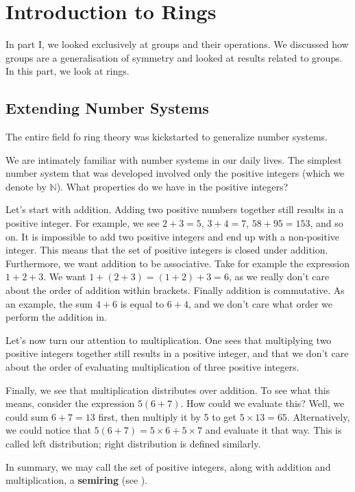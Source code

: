 \chapter{Introduction to Rings}
In part I, we looked exclusively at groups and their operations. We discussed how groups are a generalisation of symmetry and looked at results related to groups. In this part, we look at rings.

\section{Extending Number Systems}
The entire field fo ring theory was kickstarted to generalize number systems.

We are intimately familiar with number systems in our daily lives. The simplest number system that was developed involved only the positive integers (which we denote by $\mathbb{N}$). What properties do we have in the positive integers?

Let's start with addition. Adding two positive numbers together still results in a positive integer. For example, we see $2 + 3 = 5$, $3 + 4 = 7$, $58 + 95 = 153$, and so on. It is impossible to add two positive integers and end up with a non-positive integer. This means that the set of positive integers is closed under addition. Furthermore, we want addition to be associative. Take for example the expression $1 + 2 + 3$. We want $1 + (2 + 3) = (1 + 2) + 3 = 6$, as we really don't care about the order of addition within brackets. Finally addition is commutative. As an example, the sum $4 + 6$ is equal to $6 + 4$, and we don't care what order we perform the addition in.

Let's now turn our attention to multiplication. One sees that multiplying two positive integers together still results in a positive integer, and that we don't care about the order of evaluating multiplication of three positive integers.

Finally, we see that multiplication distributes over addition. To see what this means, consider the expression $5(6+7)$. How could we evaluate this? Well, we could sum $6+7 = 13$ first, then multiply it by 5 to get $5\times13 = 65$. Alternatively, we could notice that $5(6+7) = 5 \times 6 + 5 \times 7$ and evaluate it that way. This is called left distribution; right distribution is defined similarly.

In summary, we may call the set of positive integers, along with addition and multiplication, a \textbf{semiring} (see \cite{mathworld_semiring-definition}).

